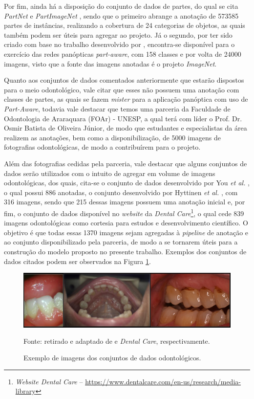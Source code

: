 Por fim, ainda há a disposição do conjunto de dados de partes, do qual se cita \textit{PartNet} \cite{mo2019} e \textit{PartImageNet} \cite{He2021}, sendo que o primeiro abrange a anotação de 573585 partes de instâncias, realizando a cobertura de 24 categorias de objetos, as quais também podem ser úteis para agregar ao projeto. Já o segundo, por ter sido criado com base no trabalho desenvolvido por \cite{DeGeus2021}, encontra-se disponível para o exercício das redes panópticas \textit{part-aware}, com 158 classes e por volta de 24000 imagens, visto que a fonte das imagens anotadas é o projeto \textit{ImageNet}.

Quanto aos conjuntos de dados comentados anteriormente que estarão dispostos para o meio odontológico, vale citar que esses não possuem uma anotação com classes de partes, as quais se fazem \textit{mister} para a aplicação panóptica com uso de \textit{Part-Aware}, todavia vale destacar que temos uma parceria da Faculdade de Odontologia de Araraquara (FOAr) - UNESP, a qual terá com líder o Prof. Dr. Osmir Batista de Oliveira Júnior, de modo que estudantes e especialistas da área realizem as anotações, bem como a disponibilização, de 5000 imagens de fotografias odontológicas, de modo a contribuírem para o projeto.

Além das fotografias cedidas pela parceria, vale destacar que alguns conjuntos de dados serão utilizados com o intuito de agregar em volume de imagens odontológicas, dos quais, cita-se o conjunto de dados desenvolvido por You \textit{et al.} \cite{You2020}, o qual possui 886 anotadas, o conjunto desenvolvido por Hyttinen \textit{et al.} \cite{Hyttinen2020}, com 316 imagens, sendo que 215 dessas imagens possuem uma anotação inicial e, por fim, o conjunto de dados disponível no \textit{website} da \textit{Dental Care}\footnote{\textit{Website \textit{Dental Care}} – \url{https://www.dentalcare.com/en-us/research/media-library}}, o qual cede 839 imagens odontológicas como cortesia para estudos e desenvolvimento científico. O objetivo é que todas essas 1370 imagens sejam agregadas à \textit{pipeline} de anotação e ao conjunto disponibilizado pela parceria, de modo a se tornarem úteis para a construção do modelo proposto no presente trabalho. Exemplos dos conjuntos de dados citados podem ser observados na Figura \ref{project:dataset:fig:2}.

\begin{figure}[H]
    \centering
    \caption{Exemplo de imagens dos conjuntos de dados odontológicos.}
    \includegraphics[width=1\textwidth]{recursos/imagens/proposal/image_odonto_dataset.png}
    \label{project:dataset:fig:2}

    Fonte: retirado e adaptado de \cite{You2020, Hyttinen2020} e \textit{Dental Care}, respectivamente.
\end{figure}

